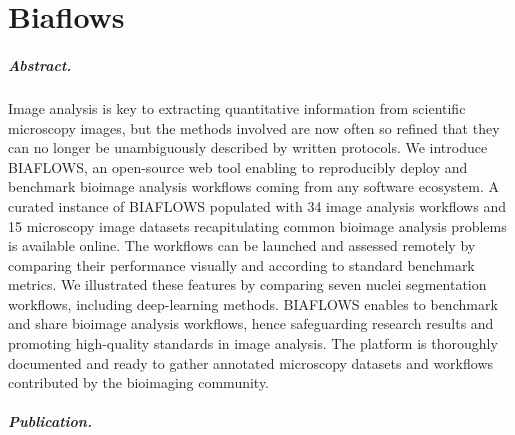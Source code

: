 \chapter{Biaflows}
\label{app:biaflows}

\paragraph{Abstract.} Image analysis is key to extracting quantitative information from scientific microscopy images, but the methods involved are now often so refined that they can no longer be unambiguously described by written protocols. We introduce BIAFLOWS, an open-source web tool enabling to reproducibly deploy and benchmark bioimage analysis workflows coming from any software ecosystem. A curated instance of BIAFLOWS populated with 34 image analysis workflows and 15 microscopy image datasets recapitulating common bioimage analysis problems is available online. The workflows can be launched and assessed remotely by comparing their performance visually and according to standard benchmark metrics. We illustrated these features by comparing seven nuclei segmentation workflows, including deep-learning methods. BIAFLOWS enables to benchmark and share bioimage analysis workflows, hence safeguarding research results and promoting high-quality standards in image analysis. The platform is thoroughly documented and ready to gather annotated microscopy datasets and workflows contributed by the bioimaging community.

\paragraph{Publication.}  

